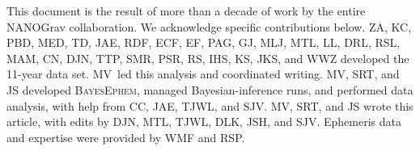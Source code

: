 This document is the result of more than a decade of work by the entire NANOGrav collaboration.
We acknowledge specific contributions below.
ZA, KC, PBD, MED, TD, JAE, RDF, ECF, EF, PAG, GJ, MLJ, MTL, LL, DRL, RSL, MAM, CN, DJN, TTP, SMR, PSR, RS, IHS, KS, JKS, and WWZ developed the 11-year data set.
MV\ led this analysis and coordinated writing.
MV, SRT, and JS developed \textsc{BayesEphem}, managed Bayesian-inference runs, and performed data analysis, with help from CC, JAE, TJWL, and SJV.
MV, SRT, and JS wrote this article, with edits by DJN, MTL, TJWL, DLK, JSH, and SJV.
Ephemeris data and expertise were provided by WMF and RSP.
